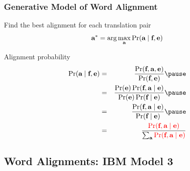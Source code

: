 \begin{frame}
\frametitle{Generative Model of Word Alignment}
\begin{block}{Find the best alignment for each translation pair}
\[ \textbf{a}^\ast = \arg\max_{\textbf{a}} \Pr(\textbf{a} \mid \textbf{f}, \textbf{e}) \]
\end{block}\pause
\begin{block}{Alignment probability}
\begin{eqnarray*}
\Pr(\aln \mid \src, \tgt) &=& \frac{ \Pr( \src, \aln, \tgt ) }{ \Pr(\src, \tgt) }\pause\\
&=& \frac{ \Pr(\tgt) \Pr( \src, \aln \mid \tgt ) }{ \Pr(\tgt) \Pr(\src \mid \tgt) }\pause\\
&=& \frac{ \Pr( \src, \aln \mid \tgt ) }{ \Pr(\src \mid \tgt) }\pause\\
&=&\frac{ \color{red} \Pr( \src, \aln \mid \tgt ) }{ \sum_{\aln} {\color{red} \Pr(\src, \aln \mid \tgt)} }
\end{eqnarray*}
\end{block}
\end{frame}

\subsection{Word Alignments: IBM Model 3}
\frame{\tableofcontents[currentsection]}

